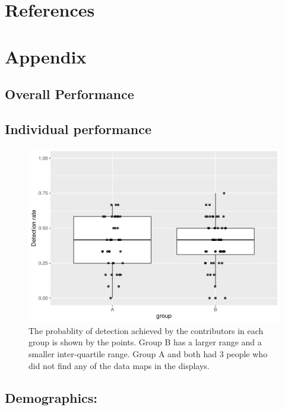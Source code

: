 \documentclass[conference,final,]{IEEEtran}
\makeatletter
\def\maxwidth{\ifdim\Gin@nat@width>\linewidth\linewidth
\else\Gin@nat@width\fi}
\let\Oldincludegraphics\includegraphics
\renewcommand{\includegraphics}[1]{\Oldincludegraphics[width=\maxwidth]{#1}}
\makeatother
\begin{document}
\hypertarget{references}{%
\section{References}\label{references}}

\newpage

\hypertarget{appendix}{%
\section{Appendix}\label{appendix}}

\hypertarget{overall-performance}{%
\subsection{Overall Performance}\label{overall-performance}}

\hypertarget{individual-performance}{%
\subsection{Individual performance}\label{individual-performance}}

\begin{figure}
\centering
\includegraphics{paper_files/figure-latex/contributors-1.pdf}
\caption{\label{fig:contributors}The probablity of detection achieved by the contributors in each group is shown by the points. Group B has a larger range and a smaller inter-quartile range. Group A and both had 3 people who did not find any of the data maps in the displays.}
\end{figure}

\hypertarget{demographics}{%
\subsection{Demographics:}\label{demographics}}
\end{document}
